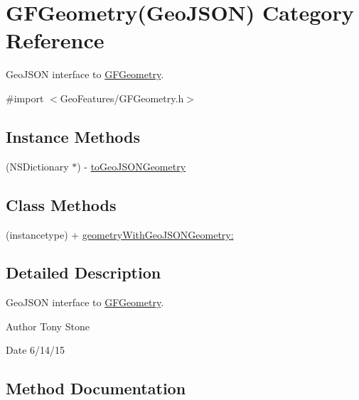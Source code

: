 \hypertarget{category_g_f_geometry_07_geo_j_s_o_n_08}{}\section{G\+F\+Geometry(Geo\+J\+S\+O\+N) Category Reference}
\label{category_g_f_geometry_07_geo_j_s_o_n_08}


Geo\+J\+S\+O\+N interface to \hyperlink{interface_g_f_geometry}{G\+F\+Geometry}.  




{\ttfamily \#import $<$Geo\+Features/\+G\+F\+Geometry.\+h$>$}

\subsection*{Instance Methods}
\begin{DoxyCompactItemize}
\item 
(N\+S\+Dictionary $\ast$) -\/ \hyperlink{category_g_f_geometry_07_geo_j_s_o_n_08_a89a1dd53c1d9a51fd5b933fde28be5b7}{to\+Geo\+J\+S\+O\+N\+Geometry}
\end{DoxyCompactItemize}
\subsection*{Class Methods}
\begin{DoxyCompactItemize}
\item 
(instancetype) + \hyperlink{category_g_f_geometry_07_geo_j_s_o_n_08_a5b730dcea33fc8b2c156199400e3014e}{geometry\+With\+Geo\+J\+S\+O\+N\+Geometry\+:}
\end{DoxyCompactItemize}


\subsection{Detailed Description}
Geo\+J\+S\+O\+N interface to \hyperlink{interface_g_f_geometry}{G\+F\+Geometry}. 

\begin{DoxyAuthor}{Author}
Tony Stone 
\end{DoxyAuthor}
\begin{DoxyDate}{Date}
6/14/15 
\end{DoxyDate}


\subsection{Method Documentation}
\hypertarget{category_g_f_geometry_07_geo_j_s_o_n_08_a5b730dcea33fc8b2c156199400e3014e}{}
